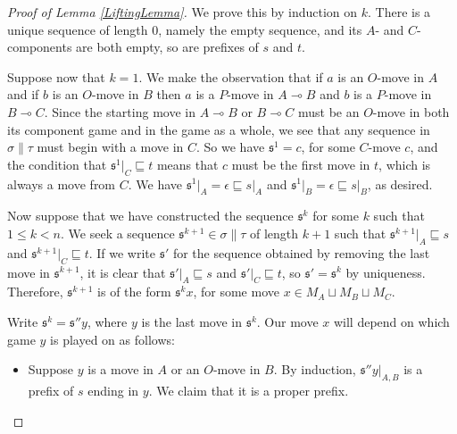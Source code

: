 \documentclass[11pt]{article} %
\theoremstyle{plain} %
\theoremstyle{definition} %
\theoremstyle{note}
\theoremstyle{exercisestyle}
\renewcommand{\implies}{\multimap}
\newcommand{\cprd}{\sqcup}
\newcommand{\s}{\mathfrak s}
\newcommand{\emptyplay}{\epsilon}
\newcommand{\prefix}{\sqsubseteq}
\begin{document}
\begin{proof}[Proof of Lemma \ref{LiftingLemma}]
  We prove this by induction on $k$.  There is a unique sequence of length $0$, namely the empty sequence, and its $A$- and $C$-components are both empty, so are prefixes of $s$ and $t$.  

  Suppose now that $k=1$.  We make the observation that if $a$ is an $O$-move in $A$ and if $b$ is an $O$-move in $B$ then $a$ is a $P$-move in $A\implies B$ and $b$ is a $P$-move in $B\implies C$.  Since the starting move in $A\implies B$ or $B\implies C$ must be an $O$-move in both its component game and in the game as a whole, we see that any sequence in $\sigma\|\tau$ must begin with a move in $C$.  So we have $\s^1=c$, for some $C$-move $c$, and the condition that $\s^1\vert_C\prefix t$ means that $c$ must be the first move in $t$, which is always a move from $C$.  We have $\s^1\vert_A=\emptyplay\prefix s\vert_A$ and $\s^1\vert_B=\emptyplay\prefix s\vert_B$, as desired.

  Now suppose that we have constructed the sequence $\s^k$ for some $k$ such that $1\le k<n$.  We seek a sequence $\s^{k+1}\in \sigma\|\tau$ of length $k+1$ such that $\s^{k+1}\vert_A\prefix s$ and $\s^{k+1}\vert_C\prefix t$.  If we write $\s'$ for the sequence obtained by removing the last move in $\s^{k+1}$, it is clear that $\s'\vert_A\prefix s$ and $\s'\vert_C\prefix t$, so $\s'=\s^k$ by uniqueness.  Therefore, $\s^{k+1}$ is of the form $\s^kx$, for some move $x\in M_A\cprd M_B\cprd M_C$.  

  Write $\s^k=\s''y$, where $y$ is the last move in $\s^k$.  Our move $x$ will depend on which game $y$ is played on as follows:
  
  \begin{itemize}
    \item Suppose $y$ is a move in $A$ or an $O$-move in $B$.  By induction, $\s''y\vert_{A,B}$ is a prefix of $s$ ending in $y$.  We claim that it is a proper prefix.  


\end{itemize}
\end{proof}
\end{document}

